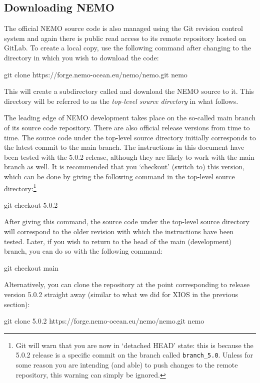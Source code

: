 \subsection{Downloading NEMO}
\label{sec:tutor-download}

The official NEMO source code is also managed using the Git revision control system and again there is public read access to its remote repository hosted on GitLab.
To create a local copy, use the following command after changing to the directory in which you wish to download the code:

\begin{VerbatimCMD}
git clone https://forge.nemo-ocean.eu/nemo/nemo.git nemo
\end{VerbatimCMD}

This will create a subdirectory called  and download the NEMO source to it.
This  directory will be referred to as the \textit{top-level source directory} in what follows.

The leading edge of NEMO development takes place on the so-called main branch of its source code repository.
There are also official release versions from time to time.
The source code under the top-level source directory initially corresponds to the latest commit to the main branch.
The instructions in this document have been tested with the 5.0.2 release, although they are likely to work with the main branch as well.
It is recommended that you `checkout' (switch to) this version, which can be done by giving the following command in the top-level source directory:\footnote{
    Git will warn that you are now in `detached HEAD' state: this is because the 5.0.2 release is a specific commit on the branch called \texttt{branch\_5.0}.
    Unless for some reason you are intending (and able) to push changes to the remote repository, this warning can simply be ignored.
}

\begin{VerbatimCMD}
git checkout 5.0.2
\end{VerbatimCMD}

After giving this command, the source code under the top-level source directory will correspond to the older revision with which the instructions have been tested.
Later, if you wish to return to the head of the main (development) branch, you can do so with the following command:

\begin{VerbatimCMD}
git checkout main
\end{VerbatimCMD}

Alternatively, you can clone the repository at the point corresponding to release version 5.0.2 straight away (similar to what we did for XIOS in the previous section):

\begingroup\small
\begin{VerbatimCMD}
git clone  5.0.2 https://forge.nemo-ocean.eu/nemo/nemo.git nemo
\end{VerbatimCMD}
\endgroup
